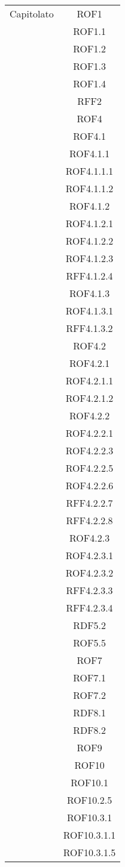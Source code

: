 \begin{longtable}{|c|c|}
\midrule
Capitolato
& ROF1\\
& ROF1.1\\
& ROF1.2\\
& ROF1.3\\
& ROF1.4\\
& RFF2\\
& ROF4\\
& ROF4.1\\
& ROF4.1.1\\
& ROF4.1.1.1\\
& ROF4.1.1.2\\
& ROF4.1.2\\
& ROF4.1.2.1\\
& ROF4.1.2.2\\
& ROF4.1.2.3\\
& RFF4.1.2.4\\
& ROF4.1.3\\
& ROF4.1.3.1\\
& RFF4.1.3.2\\
& ROF4.2\\
& ROF4.2.1\\
& ROF4.2.1.1\\
& ROF4.2.1.2\\
& ROF4.2.2\\
& ROF4.2.2.1\\
& ROF4.2.2.3\\
& ROF4.2.2.5\\
& ROF4.2.2.6\\
& RFF4.2.2.7\\
& RFF4.2.2.8\\
& ROF4.2.3\\
& ROF4.2.3.1\\
& ROF4.2.3.2\\
& RFF4.2.3.3\\
& RFF4.2.3.4\\
& RDF5.2\\
& ROF5.5\\
& ROF7\\
& ROF7.1\\
& ROF7.2\\
& RDF8.1\\
& RDF8.2\\
& ROF9\\
& ROF10\\
& ROF10.1\\
& ROF10.2.5\\
& ROF10.3.1\\
& ROF10.3.1.1\\
& ROF10.3.1.5\\

\end{longtable}
